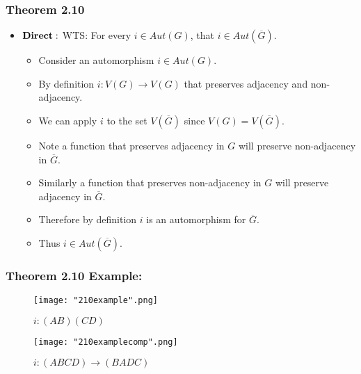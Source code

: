 \documentclass{beamer}
\begin{document}
\begin{frame}
\frametitle{Theorem 2.10}
\begin{center}

\begin{itemize}
\item $\bold{Direct:}$ WTS: For every $i\in Aut(G)$, that $i\in Aut(\overline{G})$.
	\begin{itemize}
		\item Consider an automorphism $i \in Aut(G)$.
		\vfill
		\item By definition $i: V(G) \to V(G)$ that preserves adjacency and non-adjacency. 
		\vfill
		\item We can apply $i$ to the set $V(\overline{G})$ since $V(G) = V(\overline{G})$.		
		\vfill
		\item Note a function that preserves adjacency in $G$ will preserve non-adjacency in $\overline{G}$. 
		\vfill
		\item Similarly a function that preserves non-adjacency in $G$ will preserve adjacency in $\overline{G}$. 
		\vfill
		\item Therefore by definition $i$ is an automorphism for $\overline{G}$.
		\vfill
		\item Thus $i \in Aut(\overline{G})$.
	\end{itemize}
\end{itemize}
\end{center}
\end{frame}



\begin{frame}
\frametitle{Theorem 2.10 Example:}
\begin{center}
		\begin{figure}[H]
		\caption{$i: (AB)(CD)$}
		\centering
		\texttt{[image: "210example".png]}
		\end{figure}
		
		\begin{figure}[H]
		\caption{$i: (ABCD) \to (BADC)$}
		\centering
		\texttt{[image: "210examplecomp".png]}
		\end{figure}


\end{center}
\end{frame}
\end{document}
